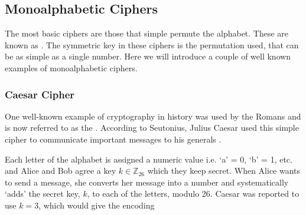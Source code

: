 

\subsection{Monoalphabetic Ciphers}

The most basic ciphers are those that simple permute the alphabet. These are known as . The symmetric key in these ciphers is the permutation used, that can be as simple as a single number. Here we will introduce a couple of well known examples of monoalphabetic ciphers. 

\subsubsection*{Caesar Cipher}

One well-known example of cryptography in history was used by the Romans and is now referred to as the . According to Seutonius, Julius Caesar used this simple cipher to communicate important messages to his generals \cite{Suetonius}. 

Each letter of the alphabet is assigned a numeric value i.e. `a' = 0, `b' = 1, etc. and Alice and Bob agree a key $k\in\mathbb{Z}_{26}$ which they keep secret. When Alice wants to send a message, she converts her message into a number and systematically `adds' the secret key, $k$, to each of the letters, modulo 26. Caesar was reported to use $k=3$, which would give the encoding 




